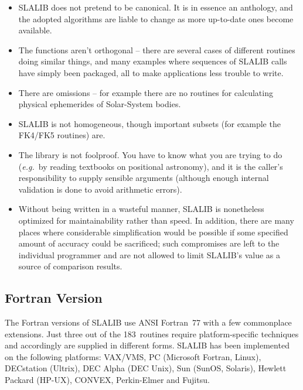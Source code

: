 \documentclass[11pt,twoside]{article}
\newcommand{\nroutines} {183}
\begin{document}
\begin{itemize}
\item SLALIB does not pretend to be canonical.  It is in essence
an anthology, and the adopted algorithms are liable
to change as more up-to-date ones become available.
\item The functions aren't orthogonal -- there are several
cases of different
routines doing similar things, and many examples where
sequences of SLALIB calls have simply been packaged, all to
make applications less trouble to write.
\item There are omissions -- for example there are no
routines for calculating physical ephemerides of
Solar-System bodies.
\item SLALIB is not homogeneous, though important subsets
(for example the FK4/FK5 routines) are.
\item The library is not foolproof.  You have to know what
you are trying to do ({\it e.g.}\ by reading textbooks on positional
astronomy), and it is the caller's responsibility to supply
sensible arguments (although enough internal validation is done to
avoid arithmetic errors).
\item Without being written in a wasteful
manner, SLALIB is nonetheless optimized for maintainability
rather than speed.  In addition, there are many places
where considerable simplification would be possible if some
specified amount of accuracy could be sacrificed;  such
compromises are left to the individual programmer and
are not allowed to limit SLALIB's value as a source
of comparison results.
\end{itemize}

\subsection{Fortran Version}
The Fortran versions of SLALIB use ANSI Fortran~77 with a few
commonplace extensions.  Just three out of the \nroutines\ routines require
platform-specific techniques and accordingly are supplied
in different forms.
SLALIB has been implemented on the following platforms:
VAX/VMS,
PC (Microsoft Fortran, Linux),
DECstation (Ultrix),
DEC Alpha (DEC Unix),
Sun (SunOS, Solaris),
Hewlett Packard (HP-UX),
CONVEX,
Perkin-Elmer and
Fujitsu.
\end{document}
